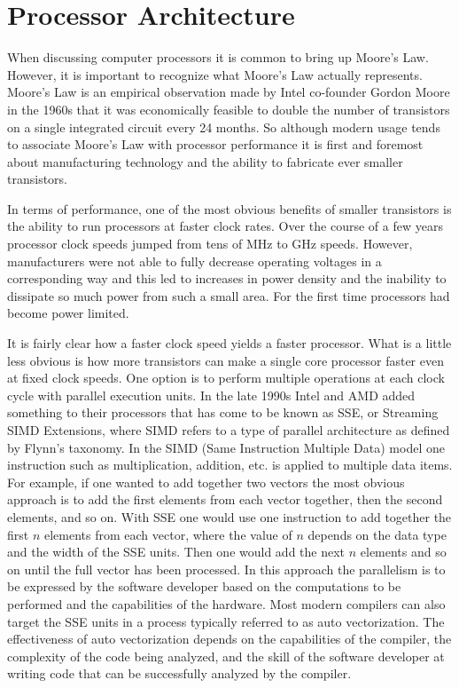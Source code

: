 \documentclass{JINST}
\begin{document}
\section{Processor Architecture}

When discussing computer processors it is common to bring up Moore's Law.  However, it is important to recognize what Moore's Law actually represents.  Moore's Law is an empirical observation made by Intel co-founder Gordon Moore in the 1960s that it was economically feasible to double the number of transistors on a single integrated circuit every 24 months.  So although modern usage tends to associate Moore's Law with processor performance it is first and foremost about manufacturing technology and the ability to fabricate ever smaller transistors.

In terms of performance, one of the most obvious benefits of smaller transistors is the ability to run processors at faster clock rates.  Over the course of a few years processor clock speeds jumped from tens of MHz to GHz speeds.  However, manufacturers were not able to fully decrease operating voltages in a corresponding way and this led to increases in power density and the inability to dissipate so much power from such a small area.  For the first time processors had become power limited.

It is fairly clear how a faster clock speed yields a faster processor.  What is a little less obvious is how more transistors can make a single core processor faster even at fixed clock speeds.  One option is to perform multiple operations at each clock cycle with parallel execution units.  In the late 1990s Intel and AMD added something to their processors that has come to be known as SSE, or Streaming SIMD Extensions, where SIMD refers to a type of parallel architecture as defined by Flynn's taxonomy.  In the SIMD (Same Instruction Multiple Data) model one instruction such as multiplication, addition, etc. is applied to multiple data items.  For example, if one wanted to add together two vectors the most obvious approach is to add the first elements from each vector together, then the second elements, and so on.  With SSE one would use one instruction to add together the first $n$ elements from each vector, where the value of $n$ depends on the data type and the width of the SSE units.  Then one would add the next $n$ elements and so on until the full vector has been processed.  In this approach the parallelism is to be expressed by the software developer based on the computations to be performed and the capabilities of the hardware.  Most modern compilers can also target the SSE units in a process typically referred to as auto vectorization.  The effectiveness of auto vectorization depends on the capabilities of the compiler, the complexity of the code being analyzed, and the skill of the software developer at writing code that can be successfully analyzed by the compiler.
\end{document}
